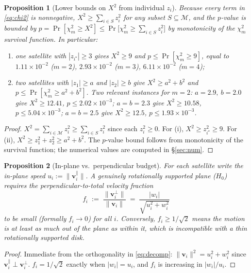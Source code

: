 \documentclass{amsart}
\newtheorem{proposition}{Proposition}
\theoremstyle{definition}
\begin{document}
\begin{proposition}[Lower bounds on $X^2$ from individual $z_i$]\label{prop:one}
Because every term in \eqref{eq:chi2} is nonnegative, $X^2\ge\sum_{i\in S}z_i^2$
for any subset $S\subseteq\mathcal M$, and the $p$-value is bounded by
$p=\Pr[\chi^2_m\ge X^2]\le\Pr\!\big[\chi^2_m\ge\sum_{i\in S}z_i^2\big]$ by
monotonicity of the $\chi^2_m$ survival function. In particular:
\begin{enumerate}
\item[(i)] one satellite with $|z_{i^\star}|\ge 3$ gives $X^2\ge 9$ and
  $p\le\Pr[\chi^2_m\ge9]$, equal to $1.11\times10^{-2}$ ($m=2$),
  $2.93\times10^{-2}$ ($m=3$), $6.11\times10^{-2}$ ($m=4$);
\item[(ii)] two satellites with $|z_1|\ge a$ and $|z_2|\ge b$ give
  $X^2\ge a^2+b^2$ and $p\le\Pr[\chi^2_m\ge a^2+b^2]$. Two relevant
  instances for $m=2$: $a=2.9,\ b=2.0$ give $X^2\ge 12.41$,
  $p\le 2.02\times10^{-3}$; $a=b=2.3$ give $X^2\ge 10.58$,
  $p\le 5.04\times10^{-3}$; $a=b=2.5$ give $X^2\ge 12.5$,
  $p\le 1.93\times10^{-3}$.
\end{enumerate}
\end{proposition}
\begin{proof}
$X^2=\sum_{i\in\mathcal M}z_i^2\ge\sum_{i\in S}z_i^2$ since each $z_i^2\ge0$.
For (i), $X^2\ge z_{i^\star}^2\ge 9$. For (ii), $X^2\ge z_1^2+z_2^2\ge a^2+b^2$.
The $p$-value bound follows from monotonicity of the survival function; the
numerical values are computed in \S\ref{sec:num}.
\end{proof}

\begin{proposition}[In-plane vs.\ perpendicular budget]\label{prop:budget}
For each satellite write the in-plane speed
$u_i:=\|\bm v_i^{\parallel}\|$. A genuinely rotationally supported plane
($H_0$) requires the perpendicular-to-total velocity fraction
\begin{equation}\label{eq:frac}
  f_i \;:=\; \frac{\|\bm v_i^{\perp}\|}{\|\bm v_i\|}
        \;=\; \frac{|w_i|}{\sqrt{u_i^2+w_i^2}}
\end{equation}
to be small (formally $f_i\to0$) for all $i$. Conversely, $f_i\ge
1/\sqrt2$ means the motion is at least as much out of the plane as within
it, which is incompatible with a thin rotationally supported disk.
\end{proposition}
\begin{proof}
Immediate from the orthogonality in \eqref{eq:decomp}:
$\|\bm v_i\|^2=u_i^2+w_i^2$ since $\bm v_i^{\parallel}\perp\bm v_i^{\perp}$.
$f_i=1/\sqrt2$ exactly when $|w_i|=u_i$, and $f_i$ is increasing in
$|w_i|/u_i$.
\end{proof}
\end{document}
